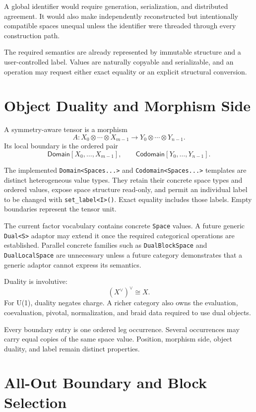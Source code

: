 \documentclass[11pt]{article}
\newcommand{\dual}[1]{#1^{\vee}}
\newcommand{\Domain}{\mathsf{Domain}}
\newcommand{\Codomain}{\mathsf{Codomain}}
\begin{document}
A global identifier would require generation, serialization, and
distributed agreement.  It would also make independently
reconstructed but intentionally compatible spaces unequal unless the
identifier were threaded through every construction path.

The required semantics are already represented by immutable structure
and a user-controlled label.  Values are naturally copyable and
serializable, and an operation may request either exact equality or an
explicit structural conversion.

\section{Object Duality and Morphism Side}

A symmetry-aware tensor is a morphism
\[
  A :
  X_0 \otimes \cdots \otimes X_{m-1}
  \longrightarrow
  Y_0 \otimes \cdots \otimes Y_{n-1}.
\]
Its local boundary is the ordered pair
\[
  \Domain[X_0,\ldots,X_{m-1}],
  \qquad
  \Codomain[Y_0,\ldots,Y_{n-1}].
\]

The implemented \texttt{Domain<Spaces...>} and
\texttt{Codomain<Spaces...>} templates are distinct heterogeneous value
types.  They retain their concrete space types and ordered values, expose
space structure read-only, and permit an individual label to be changed with
\texttt{set\_label<I>()}.  Exact equality includes those labels.  Empty
boundaries represent the tensor unit.

The current factor vocabulary contains concrete \texttt{Space} values.  A
future generic \texttt{Dual<S>} adaptor may extend it once the required
categorical operations are established.  Parallel concrete families such as
\texttt{DualBlockSpace} and \texttt{DualLocalSpace} are unnecessary
unless a future category demonstrates that a generic adaptor cannot
express its semantics.

Duality is involutive:
\[
  \dual{(\dual{X})} \cong X.
\]
For U(1), duality negates charge.  A richer category also owns the
evaluation, coevaluation, pivotal, normalization, and braid data
required to use dual objects.

Every boundary entry is one ordered leg occurrence.  Several
occurrences may carry equal copies of the same space value.  Position,
morphism side, object duality, and label remain distinct properties.

\section{All-Out Boundary and Block Selection}
\end{document}

